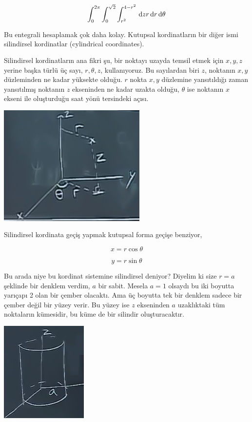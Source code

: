 \documentclass[12pt,fleqn]{article}\usepackage{../../common}
\begin{document}
$$ 
\int_{0}^{2\pi} \int_{0}^{\sqrt{2}} \int_{r^2}^{4-r^2} 
\,\mathrm{d} z r \,\mathrm{d} r \,\mathrm{d}\theta
$$

Bu entegrali hesaplamak çok daha kolay. Kutupsal kordinatların bir diğer
ismi silindirsel kordinatlar (cylindrical coordinates). 

Silindirsel kordinatların ana fikri şu, bir noktayı uzayda temsil etmek
için $x,y,z$ yerine başka türlü üç sayı, $r,\theta,z$, kullanıyoruz. Bu
sayılardan biri $z$, noktanın $x,y$ düzleminden ne kadar yüksekte
olduğu. $r$ nokta $x,y$ düzlemine yansıtıldığı zaman yansıtılmış noktanın
$z$ ekseninden ne kadar uzakta olduğu, $\theta$ ise noktanın $x$ ekseni ile
oluşturduğu saat yönü tersindeki açısı. 

\includegraphics[height=6cm]{25_8.png}

Silindirsel kordinata geçiş yapmak kutupsal forma geçişe benziyor, 

$$ x = r\cos\theta $$

$$ y = r\sin\theta $$

Bu arada niye bu kordinat sistemine silindirsel deniyor? Diyelim ki size
$r = a$ şeklinde bir denklem verdim, $a$ bir sabit. Mesela $a=1$ olsaydı bu
iki boyutta yarıçapı 2 olan bir çember olacaktı. Ama üç boyutta tek bir
denklem sadece bir çember değil bir yüzey verir. Bu yüzey ise $z$
ekseninden $a$ uzaklıktaki tüm noktaların kümesidir, bu küme de bir
silindir oluşturacaktır.

\includegraphics[height=5cm]{25_9.png}
\end{document}
